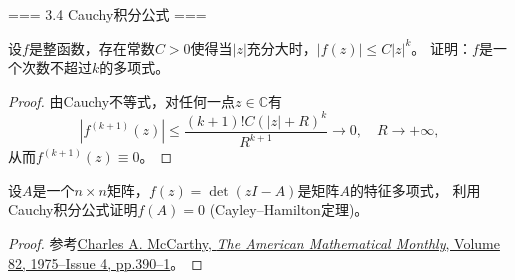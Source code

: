 === 3.4 Cauchy积分公式 ===
\begin{6}
    设$f$是整函数，存在常数$C>0$使得当$|z|$充分大时，$|f(z)|\le C|z|^k$。
    证明：$f$是一个次数不超过$k$的多项式。
\end{6}
\begin{proof}
    由Cauchy不等式，对任何一点$z\in\mathbb{C}$有
    \[|f^{(k+1)}(z)|\le\frac{(k+1)!C(|z|+R)^k}{R^{k+1}}\to0, \quad R\to+\infty,\]
    从而$f^{(k+1)}(z)\equiv0$。
\end{proof}
\begin{8}
    设$A$是一个$n \times n$矩阵，$f(z)=\det(zI-A)$是矩阵$A$的特征多项式，
    利用Cauchy积分公式证明$f(A)=0$ (Cayley--Hamilton定理)。
\end{8}
\begin{proof}
    参考\href{https://www.tandfonline.com/doi/abs/10.1080/00029890.1975.11993841}
    {Charles A. McCarthy, \textit{The American Mathematical Monthly}, Volume 82, 1975--Issue 4, pp.390--1}。
\end{proof}

